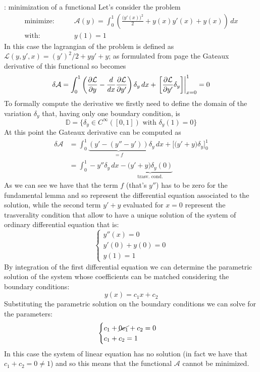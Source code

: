 	\begin{example}{: minimization of a functional}
		Let's consider the problem
		\begin{align*}
			\textrm{minimize:}& \qquad \mathcal A(y) = \int_0^1 \left( \frac{\big(y'(x)\big)^2}{2} + y(x)y'(x) + y(x) \right)\, dx \\
			\textrm{with:}& \qquad y(1) = 1
		\end{align*}
		In this case the lagrangian of the problem is defined as $\mathcal L(y,y',x) = (y')^2/2 + y y' + y$; as formulated from page \pageref{sec:func:eullag} the Gateaux derivative of this functional so becomes
		\[ \delta \mathcal A = \int_0^1 \left( \frac{\partial \mathcal L}{\partial y} - \frac{d}{dx} \frac{\partial \mathcal L}{\partial y'} \right)\delta_y\, dx + \left. \left[ \frac{\partial \mathcal L}{\partial y'} \delta_y\right] \right|_{x = 0}^1 = 0 \]
		To formally compute the derivative we firstly need to define the domain of the variation $\delta_y$ that, having only one boundary condition, is
		\[ \mathds D = \{ \delta_y \in C^\infty([0,1]) \textrm{ with } \delta_y(1) = 0\} \]
		At this point the Gateaux derivative can be computed as
		\begin{align*}
			\delta \mathcal A & = \int_0^1 \underbrace{\left( y' - (y'' - y') \right) }_{=f} \delta_y \, dx + \Big[ \big(y'+y\big) \delta_y \Big]_0^1 \\
			& = \int_0^1 -y'' \delta_y\, dx - \underbrace{\big(y'+y\big)\delta_y(0)}_\textrm{trasv. cond.}
		\end{align*}
		As we can see we have that the term $f$ (that's $y''$) has to be zero for the fundamental lemma and so represent the differential equation associated to the solution, while the second term $y'+y$ evaluated for $x = 0$ represent the trasverality condition that allow to have a unique solution of the system of ordinary differential equation that is:
		\[ \begin{cases}
			y''(x) = 0 \\ 
			y'(0) + y(0) = 0 \\
			y(1) = 1
		\end{cases} \]
		By integration of the first differential equation we can determine the parametric solution of the system whose coefficients can be matched considering the boundary conditions:
		\[ y(x) = c_1x + c_2 \]
		Substituting the parametric solution on the boundary conditions we can solve for the parameters:
		\[ \begin{cases}
			c_1 + \cancel{0c_1} + c_2 = 0 \\ c_1+c_2 = 1
		\end{cases} \]
		In this case the system of linear equation has no solution (in fact we have that $c_1 + c_2 = 0 \neq 1$) and so this means that the functional $\mathcal A$ cannot be minimized.
	
	\end{example}
	
